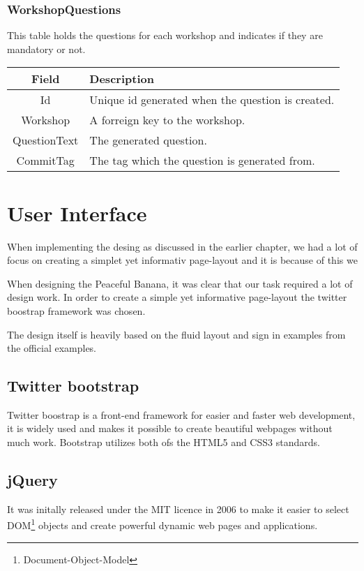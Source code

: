 \subsubsection*{WorkshopQuestions}
This table holds the questions for each workshop and indicates if they are mandatory or not. \\

\vspace{0.5cm}
\begin{tabularx}{\linewidth}{| c | X |}
    \hline
    \rowcolor[gray]{0.8}
    \textbf{Field} & \textbf{Description} \\
    \hline
    Id & Unique id generated when the question is created.\\ \hline
   	Workshop & A forreign key to the workshop.\\ \hline
   	QuestionText & The generated question.\\ \hline
   	CommitTag & The tag which the question is generated from.\\ 
    \hline
\end{tabularx}
\vspace{0.5cm}

\section{User Interface}
When implementing the desing as discussed in the earlier chapter, we had a lot of focus on creating a simplet yet informativ page-layout and it is because of this we 

When designing the Peaceful Banana, it was clear that our task required a lot of design work. In order to create a simple yet informative page-layout the twitter boostrap framework was chosen.

The design itself is heavily based on the fluid layout and sign in examples from the official examples.

\subsection{Twitter bootstrap}
Twitter boostrap is a front-end framework for easier and faster web development, it is widely used and makes it possible to create beautiful webpages without much work. Bootstrap utilizes both ofs the HTML5 and CSS3 standards.

\subsection{jQuery}
It was initally released under the MIT licence in 2006 to make it easier to select DOM\footnote{Document-Object-Model} objects and create powerful dynamic web pages and applications.

